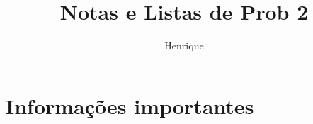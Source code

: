 \documentclass[11pt]{article}
\author{
	Henrique
}
\title{Notas e Listas de Prob 2}
\theoremstyle{definition}
\begin{document}
\maketitle

\tableofcontents
\setcounter{section}{-1}
\section{Informações importantes}

%
%



%
\end{document}
